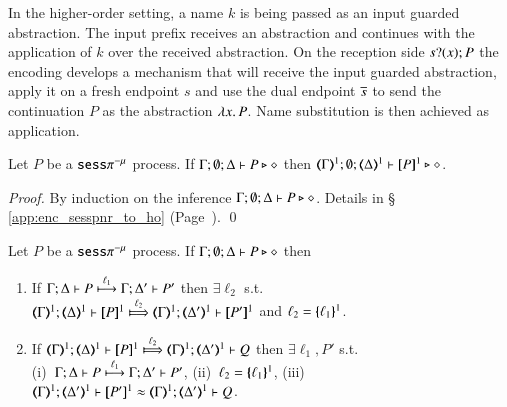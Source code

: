 In the higher-order setting, a name $k$ is being passed as an input
guarded abstraction. The input prefix receives an abstraction and
continues with the application of $k$ over the received abstraction.
On the reception side $\binp{s}{x} P$ 
the encoding develops a mechanism that will receive
the input guarded abstraction, apply it on a fresh endpoint $s$ and use
the dual endpoint $\dual{s}$ to send the continuation $P$ as the abstraction
$\abs{x}{P}$. Name substitution is then achieved as application.

\begin{proposition}\label{prop:typepres1}
Let $P$ be a  $\sessp^{-\mu}$ process.
If			$\Gamma; \emptyset; \Delta \proves P \hastype \Proc$ then 
			$\mapt{\Gamma}^{1}; \emptyset; \mapt{\Delta}^{1} \proves \map{P}^{1} \hastype \Proc$. 
\end{proposition}

\begin{proof}
By induction on the inference $\Gamma; \emptyset; \Delta \proves P \hastype \Proc$. Details in \S\,\ref{app:enc_sesspnr_to_ho} (Page~\pageref{app:enc_sesspnr_to_ho}).
	\qed
\end{proof}

\begin{proposition}
\label{p:opcorrfho}
Let $P$ be a  $\sessp^{-\mu}$ process.
If $\Gamma; \emptyset; \Delta \proves P \hastype \Proc$ then
		\begin{enumerate}[1.]
			\item	 
			   If  $\stytra{\Gamma}{\ell_1}{\Delta}{P}{\Delta'}{P'}$
			   then  $\exists \ell_2$ s.t. \\
			    $\wtytra{\mapt{\Gamma}^{1}}{\ell_2}{\mapt{\Delta}^{1}}{\map{P}^{1}}{\mapt{\Delta'}^{1}}{\map{P'}^{1}}$
			    and $\ell_2 = \mapa{\ell_1}^{1}$.
			\item   
			If  $\wtytra{\mapt{\Gamma}^{1}}{\ell_2}{\mapt{\Delta}^{1}}{\map{P}^{1}}{\mapt{\Delta'}^{1}}{Q}$
			   then $\exists \ell_1, P'$ s.t.  \\
			    (i)~$\stytra{\Gamma}{\ell_1}{\Delta}{P}{\Delta'}{P'}$,
			    (ii)~$\ell_2 = \mapa{\ell_1}^{1}$, 
			    (iii)~$\wbb{\mapt{\Gamma}^{1}}{\ell}{\mapt{\Delta'}^{1}}{\map{P'}^{1}}{\mapt{\Delta'}^{1}}{Q}$.
			    \end{enumerate}
\end{proposition}

